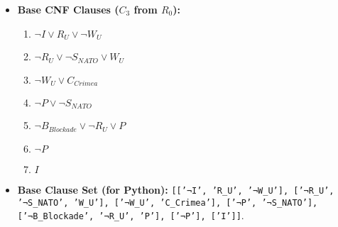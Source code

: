 \documentclass[11pt, a4paper]{article}
\begin{document}
\begin{itemize}
\begin{enumerate}
    \end{enumerate}
    \item \textbf{Base CNF Clauses ($C_3$ from $R_0$):}
    \begin{enumerate}
        \item $\neg I \vee R_U \vee \neg W_U$
        \item $\neg R_U \vee \neg S_{NATO} \vee W_U$
        \item $\neg W_U \vee C_{Crimea}$
        \item $\neg P \vee \neg S_{NATO}$
        \item $\neg B_{Blockade} \vee \neg R_U \vee P$
        \item $\neg P$
        \item $I$
    \end{enumerate}
    \item \textbf{Base Clause Set (for Python):} \texttt{[['¬I', 'R_U', '¬W_U'], ['¬R_U', '¬S_{NATO}', 'W_U'], ['¬W_U', 'C_{Crimea}'], ['¬P', '¬S_{NATO}'], ['¬B_{Blockade}', '¬R_U', 'P'], ['¬P'], ['I']]}.


\end{itemize}
\end{document}
